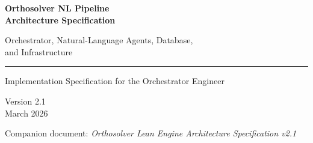 \documentclass[11pt,a4paper]{article}
\newcommand{\Lean}{\textsc{Lean}}
\newcommand{\Claude}{Claude}
\begin{document}
\begin{titlepage}
\centering
\vspace*{1.6cm}

{\Huge\bfseries\color{deepblue} Orthosolver NL Pipeline \\[0.3cm] Architecture Specification}

\vspace{0.8cm}

{\Large\color{midblue} Orchestrator, Natural-Language Agents, Database, \\[0.15cm] and Infrastructure}

\vspace{0.7cm}
\rule{0.75\textwidth}{1pt}

\vspace{1.0cm}

{\large Implementation Specification for the Orchestrator Engineer}

\vspace{0.4cm}

{\normalsize Version 2.1 \\ March 2026}

\vspace{1.5cm}

\begin{abstract}
\noindent This document specifies the complete architecture of the Orthosolver natural-language pipeline: the orchestrator that drives the proof search, the five NL agents (semantic sketch generator, decomposer, decomposition vetter, lemma solver, lemma proof vetter), the controller state machine and routing policy, the persistent data model and relational database schema, the public API, the NL-only operating mode, and the GCP infrastructure managed via Terraform. This document also specifies the complete HTTP API contract for the \Lean{} engine so the orchestrator can call it correctly, but it does \textbf{not} specify the \Lean{} engine's internal implementation (repair loop, \Claude{} agent, Docker build). That is covered in the companion document: \textit{Orthosolver Lean Engine Architecture Specification}.
\end{abstract}

\vfill

{\small Companion document: \textit{Orthosolver Lean Engine Architecture Specification v2.1}}
\end{titlepage}

\tableofcontents
\newpage

\end{document}
